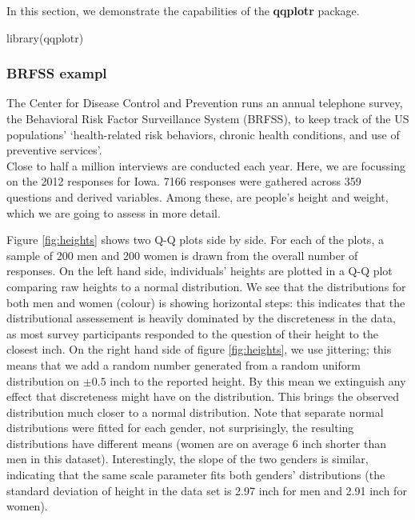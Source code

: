 \label{sec:examples}

In this section, we demonstrate the capabilities of the \textbf{qqplotr}
package.

\begin{Schunk}
\begin{Sinput}
library(qqplotr)
\end{Sinput}
\end{Schunk}

\subsubsection{BRFSS exampl}\label{brfss-exampl}

The Center for Disease Control and Prevention runs an annual telephone
survey, the Behavioral Risk Factor Surveillance System (BRFSS), to keep
track of the US populations' `health-related risk behaviors, chronic
health conditions, and use of preventive services'.\\
Close to half a million interviews are conducted each year. Here, we are
focussing on the 2012 responses for Iowa. 7166 responses were gathered
across 359 questions and derived variables. Among these, are people's
height and weight, which we are going to assess in more detail.

Figure \ref{fig:heights} shows two Q-Q plots side by side. For each of
the plots, a sample of 200 men and 200 women is drawn from the overall
number of responses. On the left hand side, individuals' heights are
plotted in a Q-Q plot comparing raw heights to a normal distribution. We
see that the distributions for both men and women (colour) is showing
horizontal steps: this indicates that the distributional assessement is
heavily dominated by the discreteness in the data, as most survey
participants responded to the question of their height to the closest
inch. On the right hand side of figure \ref{fig:heights}, we use
jittering; this means that we add a random number generated from a
random uniform distribution on \(\pm 0.5\) inch to the reported height.
By this mean we extinguish any effect that discreteness might have on
the distribution. This brings the observed distribution much closer to a
normal distribution. Note that separate normal distributions were fitted
for each gender, not surprisingly, the resulting distributions have
different means (women are on average 6 inch shorter than men in this
dataset). Interestingly, the slope of the two genders is similar,
indicating that the same scale parameter fits both genders'
distributions (the standard deviation of height in the data set is 2.97
inch for men and 2.91 inch for women).

